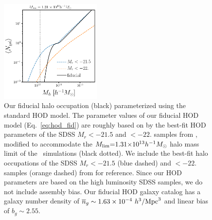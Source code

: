 \begin{figure}
\begin{center}
    \includegraphics[width=0.45\textwidth]{figs/hod_fid.pdf} 
    \caption{Our fiducial halo occupation (black) parameterized using the
    standard \cite{zheng2007} HOD model. The parameter values of our fiducial
    HOD model (Eq.~\ref{eq:hod_fid}) are roughly based on by the best-fit HOD
    parameters of the SDSS $M_r < -21.5$ and $< -22.$ samples from
    \cite{zheng2007}, modified to accommodate the $M_{\rm lim}{=}1.31{\times}
    10^{13} h^{-1}M_\odot$ halo mass limit of the \quij~simulations (black
    dotted). We include the best-fit halo occupations of the SDSS  $M_r <
    -21.5$ (blue dashed) and $< -22.$ samples (orange dashed) from
    \cite{zheng2007} for reference. Since our HOD parameters are based on the
    high luminosity SDSS samples, we do not include assembly bias.  Our
    fiducial HOD galaxy catalog has a galaxy number density of 
    $\overline{n}_g \sim 1.63\times10^{-4}~h^3/{\rm Mpc}^3$ and linear bias of
    $b_g \sim 2.55$.
    }\label{fig:hod}
\end{center}
\end{figure}

